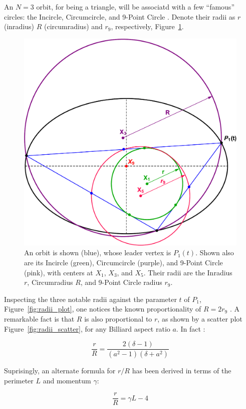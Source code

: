An $N=3$ orbit, for being a triangle, will be associatd with a few ``famous'' circles: the Incircle, Circumcircle, and 9-Point Circle \cite{mw}. Denote their radii as $r$ (inradius) $R$ (circumradius) and $r_9$, respectively,  Figure~\ref{fig:radii}.

\begin{figure}[H]
    \centering
    \includegraphics[width=.7\textwidth]{pics/0070_Radii.pdf}
    \caption{An orbit is shown (blue), whose leader vertex is $P_1(t)$. Shown also are its  Incircle (green), Circumcircle (purple), and 9-Point Circle (pink), with centers at $X_1$, $X_3$, and $X_5$. Their radii are the Inradius $r$, Circumradius $R$, and 9-Point Circle radius $r_9$.}
    \label{fig:radii}
\end{figure}

Inspecting the three notable radii against the parameter $t$ of $P_1$, Figure~\ref{fig:radii_plot}, one notices the known proportionality of $R=2r_9$ \cite{mw}. A remarkable fact is that $R$ is also proportional to $r$, as shown by a scatter plot Figure~\ref{fig:radii_scatter}, for any Billiard aspect ratio $a$. In fact \cite{ronaldo19a}:

\begin{equation}
\frac{r}{R}=\frac{2(\delta-1)}{(a^2-1)(\delta+a^2)}
\label{eqn:r-ov-R}
\end{equation}

Suprisingly, an alternate formula for $r/R$ has been derived \cite{dominique19,sergei19_private_circles} in terms of the perimeter $L$ and momentum $\gamma$:

\begin{equation}
    \frac{r}{R} = \gamma L - 4
    \label{eqn:rR_dominique}
\end{equation}

